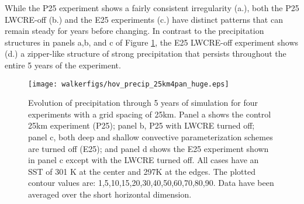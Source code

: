 \documentclass[draft]{agujournal2019}
\begin{document}
While the P25 experiment shows a fairly consistent irregularity (a.), both the P25 LWCRE-off (b.) and the E25 experiments (c.) have distinct patterns that 
can remain steady for years before changing.  In contrast to the precipitation structures in panels a,b, and c of Figure \ref{fig:hov_25km_4pan}, the E25 LWCRE-off experiment 
shows (d.) a zipper-like structure of strong precipitation that persists throughout the entire 5 years of the experiment.  




\begin{figure}
  \centering
      \texttt{[image: walkerfigs/hov\_precip\_25km4pan\_huge.eps]}
  \caption{Evolution of precipitation through 5 years of simulation for four experiments with a grid spacing of
  25km.  Panel a shows the  control 25km experiment (P25); 
  panel b, P25 with LWCRE turned off; panel c, both deep and shallow convective parameterization schemes are turned off (E25); 
  and panel d shows the E25 experiment shown in panel c except with the LWCRE turned off.  
  All cases have an SST of 301 K at the center and 297K at the edges.  
  The plotted contour values are: 1,5,10,15,20,30,40,50,60,70,80,90.  Data have been averaged over the short horizontal dimension.}
  \label{fig:hov_25km_4pan}
\end{figure}

\end{document}
